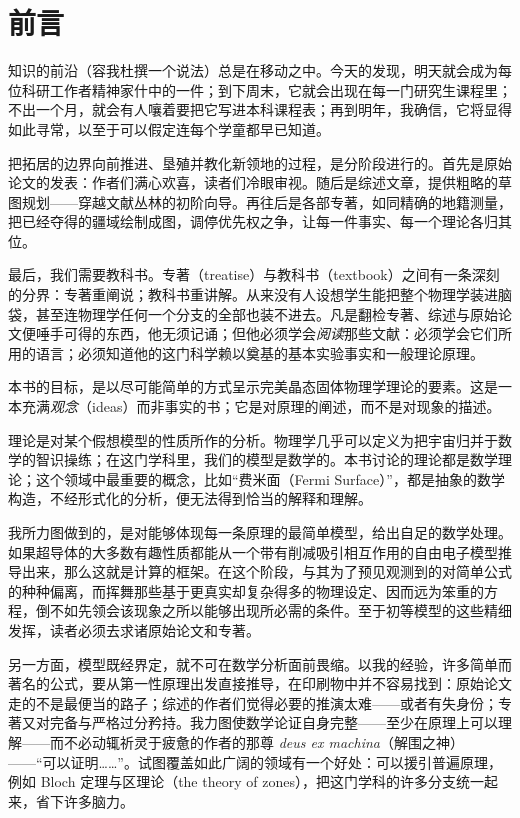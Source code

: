 
\chapter*{前言}

知识的前沿（容我杜撰一个说法）总是在移动之中。今天的发现，明天就会成为每位科研工作者精神家什中的一件；到下周末，它就会出现在每一门研究生课程里；不出一个月，就会有人嚷着要把它写进本科课程表；再到明年，我确信，它将显得如此寻常，以至于可以假定连每个学童都早已知道。

把拓居的边界向前推进、垦殖并教化新领地的过程，是分阶段进行的。首先是原始论文的发表：作者们满心欢喜，读者们冷眼审视。随后是综述文章，提供粗略的草图规划——穿越文献丛林的初阶向导。再往后是各部专著，如同精确的地籍测量，把已经夺得的疆域绘制成图，调停优先权之争，让每一件事实、每一个理论各归其位。

最后，我们需要教科书。专著（treatise）与教科书（textbook）之间有一条深刻的分界：专著重阐说；教科书重讲解。从来没有人设想学生能把整个物理学装进脑袋，甚至连物理学任何一个分支的全部也装不进去。凡是翻检专著、综述与原始论文便唾手可得的东西，他无须记诵；但他必须学会\emph{阅读}那些文献：必须学会它们所用的语言；必须知道他的这门科学赖以奠基的基本实验事实和一般理论原理。

本书的目标，是以尽可能简单的方式呈示完美晶态固体物理学理论的要素。这是一本充满\emph{观念}（ideas）而非事实的书；它是对原理的阐述，而不是对现象的描述。

理论是对某个假想模型的性质所作的分析。物理学几乎可以定义为把宇宙归并于数学的智识操练；在这门学科里，我们的模型是数学的。本书讨论的理论都是数学理论；这个领域中最重要的概念，比如“费米面（Fermi Surface）”，都是抽象的数学构造，不经形式化的分析，便无法得到恰当的解释和理解。

我所力图做到的，是对能够体现每一条原理的最简单模型，给出自足的数学处理。如果超导体的大多数有趣性质都能从一个带有削减吸引相互作用的自由电子模型推导出来，那么这就是计算的框架。在这个阶段，与其为了预见观测到的对简单公式的种种偏离，而挥舞那些基于更真实却复杂得多的物理设定、因而远为笨重的方程，倒不如先领会该现象之所以能够出现所必需的条件。至于初等模型的这些精细发挥，读者必须去求诸原始论文和专著。

另一方面，模型既经界定，就不可在数学分析面前畏缩。以我的经验，许多简单而著名的公式，要从第一性原理出发直接推导，在印刷物中并不容易找到：原始论文走的不是最便当的路子；综述的作者们觉得必要的推演太难——或者有失身份；专著又对完备与严格过分矜持。我力图使数学论证自身完整——至少在原理上可以理解——而不必动辄祈灵于疲惫的作者的那尊 \emph{deus ex machina}（解围之神）——“可以证明……”。试图覆盖如此广阔的领域有一个好处：可以援引普遍原理，例如 Bloch 定理与区理论（the theory of zones），把这门学科的许多分支统一起来，省下许多脑力。


